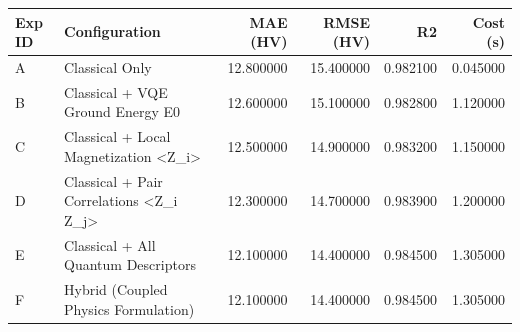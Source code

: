 \begin{tabular}{llrrrr}
\toprule
Exp ID & Configuration & MAE (HV) & RMSE (HV) & R2 & Cost (s) \\
\midrule
A & Classical Only & 12.800000 & 15.400000 & 0.982100 & 0.045000 \\
B & Classical + VQE Ground Energy E0 & 12.600000 & 15.100000 & 0.982800 & 1.120000 \\
C & Classical + Local Magnetization <Z_i> & 12.500000 & 14.900000 & 0.983200 & 1.150000 \\
D & Classical + Pair Correlations <Z_i Z_j> & 12.300000 & 14.700000 & 0.983900 & 1.200000 \\
E & Classical + All Quantum Descriptors & 12.100000 & 14.400000 & 0.984500 & 1.305000 \\
F & Hybrid (Coupled Physics Formulation) & 12.100000 & 14.400000 & 0.984500 & 1.305000 \\
\bottomrule
\end{tabular}
